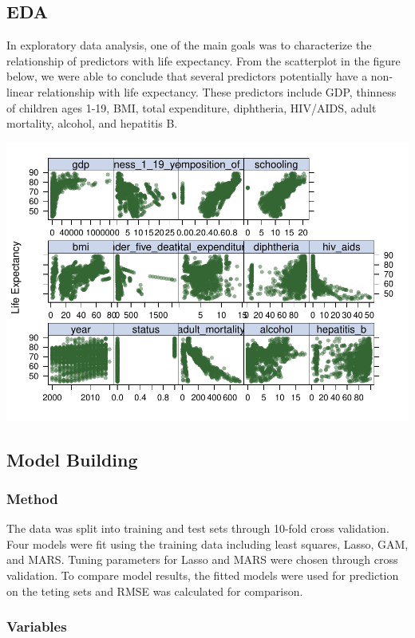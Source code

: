\documentclass[]{article}
\begin{document}
\subsection{EDA}\label{eda}

In exploratory data analysis, one of the main goals was to characterize
the relationship of predictors with life expectancy. From the
scatterplot in the figure below, we were able to conclude that several
predictors potentially have a non-linear relationship with life
expectancy. These predictors include GDP, thinness of children ages
1-19, BMI, total expenditure, diphtheria, HIV/AIDS, adult mortality,
alcohol, and hepatitis B.

\includegraphics{midterm_project_report_files/figure-latex/unnamed-chunk-2-1.pdf}

\subsection{Model Building}\label{model-building}

\subsubsection{Method}\label{method}

The data was split into training and test sets through 10-fold cross
validation. Four models were fit using the training data including least
squares, Lasso, GAM, and MARS. Tuning parameters for Lasso and MARS were
chosen through cross validation. To compare model results, the fitted
models were used for prediction on the teting sets and RMSE was
calculated for comparison.

\subsubsection{Variables}\label{variables}
\end{document}
